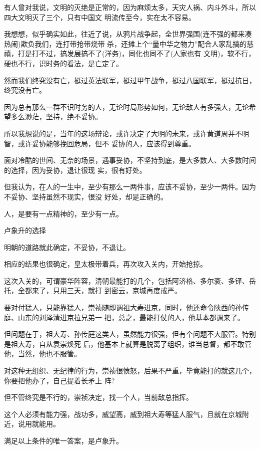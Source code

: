 \documentclass[11pt,a4paper,onecolumn]{article}
\begin{document}
有人曾对我说，文明的灭绝是正常的，因为麻烦太多，天灾人祸、内斗外斗，所以四大文明灭了三个，只有中国文
明流传至今，实在太不容易。

我想想，似乎确实如此，往近了说，从鸦片战争起，全世界强国(连不强的都来凑热闹)欺负我们，连打带抢带烧带
杀，还摊上个``量中华之物力''配合人家乱搞的慈禧，打是打不过，搞发展搞不了(洋务)，同化也同不了(人家也有
文明)，软不行，硬也不行，识时务的看法，是亡定了。

然而我们终究没有亡，挺过英法联军，挺过甲午战争，挺过八国联军，挺过抗日，终究没有亡。

因为总有那么一群不识时务的人，无论时局形势如何，无论敌人有多强大，无论希望多么渺茫，坚持，绝不妥协。

所以我想说的是，当年的这场辩论，或许决定了大明的未来，或许黄道周并不明智，或许妥协能够挽回危局，但不
妥协的人，应该得到尊重。

面对冷酷的世间、无奈的场景，遇事妥协，不坚持到底，是大多数人、大多数时间的选择，因为妥协，退让很现
实，很有好处。

但我认为，在人的一生中，至少有那么一两件事，应该不妥协，至少一两件。因为不妥协、坚持虽然不现实，很没
好处，却是正确的。

人，是要有一点精神的，至少有一点。

卢象升的选择

明朝的道路就此确定，不妥协，不退让。

相应的结果也很确定，皇太极带着兵，再次攻入关内，开始抢掠。

这次入关的，可谓豪华阵容，清朝最能打的几个，包括阿济格、多尔衮、多铎、岳托，全都来了，只用三天，就打
到密云，京城再度戒严。

要对付猛人，只能靠猛人，崇祯随即调祖大寿进京，同时，他还命令陕西的孙传庭、山东的刘泽清进京拉兄弟一
把，总之，最能打仗的人，他基本都调来了。

但问题在于，祖大寿、孙传庭这类人，虽然能力很强，但有个问题\myrule 不大服管。特别是祖大寿，自从袁崇焕死
后，他基本上就算是脱离了组织，谁当总督，都不敢管他，当然，他也不服管。

对这种无组织、无纪律的行为，崇祯很愤怒，后果不严重，毕竟能打的就这几个，你要把他办了，自己提着长矛上
阵?

但不管终究是不行的，崇祯决定，找一个人，当前敌总指挥。

这个人必须有能力强，战功多，威望高，威到祖大寿等猛人服气，且就在京城附近，说用就能用。

满足以上条件的唯一答案，是卢象升。

\section[\thesection]{}
\end{document}
